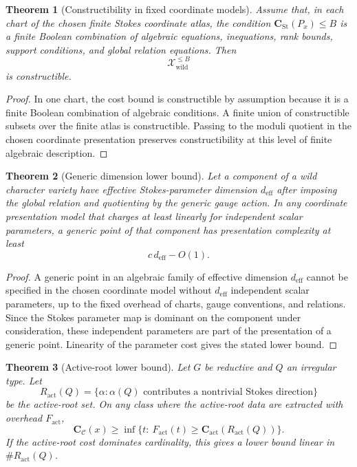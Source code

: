 \documentclass[11pt]{article}
\newtheorem{theorem}{Theorem}[section]
\begin{document}
\begin{theorem}[Constructibility in fixed coordinate models]
Assume that, in each chart of the chosen finite Stokes coordinate atlas, the condition \(\mathbf C_{\operatorname{St}}(P_x)\le B\) is a finite Boolean combination of algebraic equations, inequations, rank bounds, support conditions, and global relation equations.  Then
\[
\mathcal X_{\operatorname{wild}}^{\le B}
\]
is constructible.
\end{theorem}

\begin{proof}
In one chart, the cost bound is constructible by assumption because it is a finite Boolean combination of algebraic conditions.  A finite union of constructible subsets over the finite atlas is constructible.  Passing to the moduli quotient in the chosen coordinate presentation preserves constructibility at this level of finite algebraic description.
\end{proof}

\begin{theorem}[Generic dimension lower bound]
Let a component of a wild character variety have effective Stokes-parameter dimension \(d_{\operatorname{eff}}\) after imposing the global relation and quotienting by the generic gauge action.  In any coordinate presentation model that charges at least linearly for independent scalar parameters, a generic point of that component has presentation complexity at least
\[
c\,d_{\operatorname{eff}}-O(1).
\]
\end{theorem}

\begin{proof}
A generic point in an algebraic family of effective dimension \(d_{\operatorname{eff}}\) cannot be specified in the chosen coordinate model without \(d_{\operatorname{eff}}\) independent scalar parameters, up to the fixed overhead of charts, gauge conventions, and relations.  Since the Stokes parameter map is dominant on the component under consideration, these independent parameters are part of the presentation of a generic point.  Linearity of the parameter cost gives the stated lower bound.
\end{proof}

\begin{theorem}[Active-root lower bound]
Let \(G\) be reductive and \(Q\) an irregular type.  Let
\[
R_{\operatorname{act}}(Q)
=
\{\alpha:\alpha(Q)\text{ contributes a nontrivial Stokes direction}\}
\]
be the active-root set.  On any class where the active-root data are extracted with overhead \(F_{\operatorname{act}}\),
\[
\mathbf C_{\mathcal C}(x)
\ge
\inf\{t:\ F_{\operatorname{act}}(t)\ge
\mathbf C_{\operatorname{act}}(R_{\operatorname{act}}(Q))\}.
\]
If the active-root cost dominates cardinality, this gives a lower bound linear in \(\#R_{\operatorname{act}}(Q)\).
\end{theorem}
\end{document}
